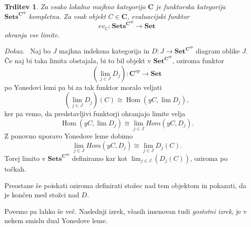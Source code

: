 \documentclass[12pt,a4paper]{book}
\theoremstyle{definition}
\theoremstyle{plain}
\newtheorem{trditev}[definicija]{Trditev}
\newenvironment{dokaz}{\emph{Dokaz.}\ }{\hspace{\fill}{$\Box$}}
\theoremstyle{definition}
\theoremstyle{remark}
\newcommand{\cat}[1]{\textbf{#1}}
\DeclareMathOperator{\Hom}{Hom}
\newcommand{\predsnop}[1]{\cat{Sets}^{\cat{#1}^{op}}}
\begin{document}
\begin{trditev} \label{trditev 3.3}
Za vsako lokalno majhno kategorijo $\cat{C}$ je funktorska kategorija $\predsnop{C}$ kompletna. Za vsak objekt $C \in \cat{C}$, evaluacijski funktor 
$$ev_C : \predsnop{C} \to \cat{Set}$$
ohranja vse limite.
\end{trditev}
\begin{dokaz}
Naj bo $J$ majhna indeksna kategorija in $D : J \to \cat{Set}^{\cat{C}^{op}}$ diagram oblike $J$. Če naj bi taka limita obstajala, bi to bil objekt v $\cat{Set}^{\cat{C}^{op}}$, oziroma funktor 
$$(\lim_{j \in J} D_j): \cat{C}^{op} \to \cat{Set}$$
po Yonedovi lemi pa bi za tak funktor moralo veljati
$$(\lim_{j \in J} D_j)(C) \cong \Hom(yC, \lim D_j),$$
ker pa vemo, da predstavljivi funktorji ohranjajo limite velja
$$\Hom(yC, \lim D_j) \cong \lim_{j \in J} Hom(yC, D_j).$$
Z ponovno uporavo Yonedove leme dobimo
$$\lim_{j \in J} Hom(yC, D_j) \cong \lim_{j \in J} D_j(C).$$
Torej limito v $\predsnop{C}$ definiramo kar kot $\lim_{j \in J} (D_j(C))$, oziroma po točkah.

Preostane še poiskati oziroma definirati stožec nad tem objektom in pokazati, da je končen med stožci nad $D$.


\end{dokaz}

Povemo pa lahko še več. Naslednji izrek, všasih imenovan tudi \emph{gostotni izrek}, je v nekem smislu dual Yonedove leme.
\end{document}
